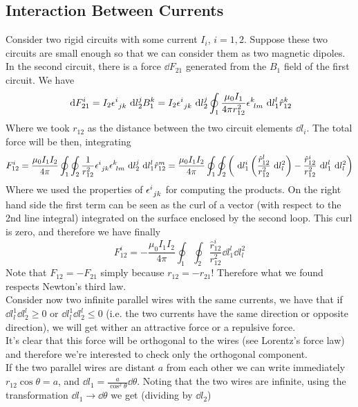 \documentclass[../electromagnetism]{subfiles}
\begin{document}
\subsection{Interaction Between Currents}
Consider two rigid circuits with some current $I_i$, $i=1,2$. Suppose these two circuits are small enough so that we can consider them as two magnetic dipoles.\\
In the second circuit, there is a force $\dd F_{21}$ generated from the $B_1$ field of the first circuit. We have
\begin{equation*}
	\ \mathrm{d} F^i_{21}=I_2\epsilon^{i}_{\ jk}\ \mathrm{d} l_2^jB_{1}^k=I_2\epsilon^{i}_{\ jk}\ \mathrm{d} l^j_2\oint_{1}\frac{\mu_0I_1}{4\pi r^2_{12}}\epsilon^{k}_{\ lm}\ \mathrm{d} l_1^l\hat{r}_{12}^k
\end{equation*}
Where we took $r_{12}$ as the distance between the two circuit elements $\dd l_{i}$. The total force will be then, integrating
\begin{equation}
	F^i_{12}=\frac{\mu_0I_1I_2}{4\pi}\oint_1\oint_2\frac{1}{r_{12}^2}\epsilon^{i}_{\ jk}\epsilon^{k}_{\ lm}\ \mathrm{d} l^j_2\ \mathrm{d} l^l_1\hat{r}^m_{12}=\frac{\mu_0I_1I_2}{4\pi}\oint_1\oint_2\left( \ \mathrm{d} l_1^i\left( \frac{\hat{r}_{12}^l}{r_{12}^2}\ \mathrm{d} l_l^2 \right)-\frac{\hat{r}^i_{12}}{r^2_{12}}\ \mathrm{d} l^l_1\ \mathrm{d} l^2_l \right)
	\label{eq:forcebwcirc}
\end{equation}
Where we used the properties of $\epsilon^{i}_{\ jk}$ for computing the products. On the right hand side the first term can be seen as the curl of a vector (with respect to the 2nd line integral) integrated on the surface enclosed by the second loop. This curl is zero, and therefore we have finally
\begin{equation}
	F^i_{12}=-\frac{\mu_0I_1I_2}{4\pi}\oint_1\oint_2\frac{\hat{r}^i_{12}}{r_{12}^2}\dd l_1^l\dd l_l^2
	\label{eq:forcebwcircuits}
\end{equation}
Note that $F_{12}=-F_{21}$ simply because $r_{12}=-r_{21}$! Therefore what we found respects Newton's third law.\\
Consider now two infinite parallel wires with the same currents, we have that if $\dd l^1_l\dd l^l_2\ge0$ or $\dd l^1_l\dd l^l_2\le0$ (i.e. the two currents have the same direction or opposite direction), we will get wither an attractive force or a repulsive force.\\
It's clear that this force will be orthogonal to the wires (see Lorentz's force law) and therefore we're interested to check only the orthogonal component.\\
If the two parallel wires are distant $a$ from each other we can write immediately $r_{12}\cos\theta=a$, and $\dd l_1=\frac{a}{\cos^2\theta}\dd\theta$. Noting that the two wires are infinite, using the transformation $\dd l_1\to\dd\theta$ we get (dividing by $\dd l_2$)
\end{document}
